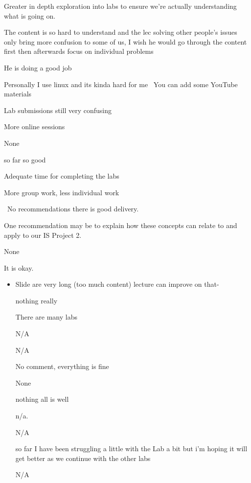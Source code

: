 \documentclass[
]{article}
\providecommand{\tightlist}{%
  \setlength{\itemsep}{0pt}\setlength{\parskip}{0pt}}
\begin{document}
\begin{enumerate}
\begin{itemize}
    Greater in depth exploration into labs to ensure we're actually
    understanding what is going on.

    The content is so hard to understand and the lec solving other
    people's issues only bring more confusion to some of us, I wish he
    would go through the content first then afterwards focus on
    individual problems

    He is doing a good job

    Personally I use linux and its kinda hard for me~ You can add some
    YouTube materials~

    Lab submissions still very confusing

    More online sessions

    None

    so far so good

    Adequate time for completing the labs

    More group work, less individual work

    ~No recommendations there is good delivery.

    One recommendation may be to explain how these concepts can relate
    to and apply to our IS Project 2.

    None

    It is okay.

    \begin{itemize}
    \tightlist
    \item
      Slide are very long (too much content) lecture can improve on
      that-

      nothing really

      There are many labs

      N/A

      N/A

      No comment, everything is fine

      None

      nothing all is well

      n/a.

      N/A

      so far I have been struggling a little with the Lab a bit but i'm
      hoping it will get better as we continue with the other labs

      N/A
    \end{itemize}
  \end{itemize}
\end{enumerate}
\end{document}
